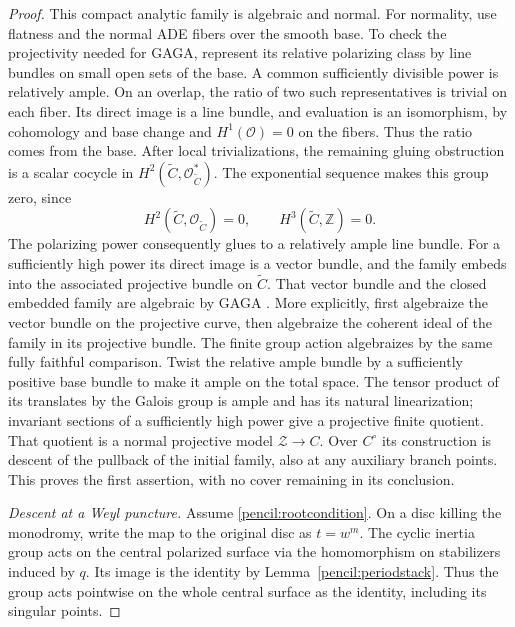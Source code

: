 \documentclass[11pt]{amsart}
\newcommand{\Z}{\mathbb Z}
\theoremstyle{definition}
\theoremstyle{remark}
\numberwithin{equation}{section}
\begin{document}
\begin{proof}
This compact analytic family is algebraic and normal.  For normality,
use flatness and the normal ADE fibers over the smooth base.  To check
the projectivity
needed for GAGA, represent its relative polarizing class by line bundles
on small open sets of the base.  A common sufficiently divisible power
is relatively ample.  On an overlap, the ratio of two such representatives
is trivial on each fiber.  Its direct image is a line bundle, and
evaluation is an isomorphism, by cohomology and base change and
\(H^1(\mathcal O)=0\) on the fibers.  Thus the ratio comes from the
base.  After local trivializations, the remaining gluing obstruction
is a scalar cocycle in \(H^2(\widetilde C,\mathcal O_{\widetilde C}^*)\).
The exponential sequence makes this group zero, since
\[
 H^2(\widetilde C,\mathcal O_{\widetilde C})=0,
 \qquad H^3(\widetilde C,\Z)=0.
\]
The polarizing power consequently glues to a relatively ample line bundle.
For a sufficiently high power its direct image is a vector bundle, and
the family embeds into the associated projective bundle on
\(\widetilde C\).  That vector bundle and the closed embedded family
are algebraic by GAGA \cite[Theorems~2--3]{SerreGAGA}.  More explicitly,
first algebraize the vector bundle on the projective curve, then
algebraize the coherent ideal of the family in its projective bundle.
The finite group action algebraizes by the same fully faithful
comparison.  Twist the relative ample bundle by a sufficiently positive
base bundle to make it ample on the total space.  The tensor product
of its translates by the Galois group is ample and has its natural
linearization; invariant sections of a sufficiently high power give a
projective finite quotient.  That quotient is a normal projective model
\(\mathcal Z\to C\).  Over \(C^\circ\) its construction is descent of
the pullback of the initial family, also at any auxiliary branch points.
This proves
the first assertion, with no cover remaining in its conclusion.

\emph{Descent at a Weyl puncture.}
Assume \eqref{pencil:rootcondition}.  On a disc killing the monodromy,
write the map to the original disc as \(t=w^m\).  The cyclic inertia
group acts on the central polarized surface via the homomorphism on
stabilizers induced by \(q\).  Its image is the identity by
Lemma~\ref{pencil:periodstack}.  Thus the group acts pointwise on the
whole central surface as the identity, including its singular points.


\end{proof}
\end{document}

